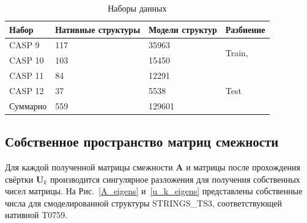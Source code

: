 \documentclass[14pt]{extarticle}
\begin{document}
\begin{table}[H]
		\centering
		\begin{tabular}{p{28mm}|p{26mm}p{26mm}|p{28mm}}
		\hline Набор & Нативные структуры & Модели структур& Разбиение\\
		\hline 
		CASP 9 & 117 & 35963 &  \multirow{2}{*}{Train,} \\
		CASP 10 & 103 & 15450 & \multirow{2}{*}{Validation} \\
		CASP 11 & 84 & 12291 &  \\
		\hline 
		CASP 12 & 37 & 5538 & {Test} \\
		\hline
		Суммарно & 559 & 129601 &
		\end{tabular}
		\caption{Наборы данных}
		\label{table:student}
\end{table}


\subsection{Собственное пространство матриц смежности}

Для каждой полученной матрицы смежности $\textbf{A}$ и матрицы после прохождения свёртки $\textbf{U}_k$ производится сингулярное разложения для получения собственных чисел матрицы. На Рис.~\ref{A_eigens} и~\ref{u_k_eigens} представлены собственные числа для смоделированной структуры STRINGS\_TS3, соответствующей нативной T0759.
\end{document}
